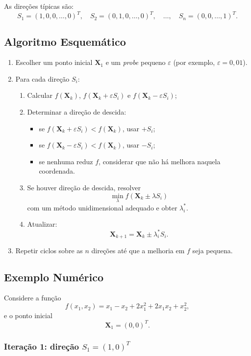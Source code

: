 \documentclass[9pt,a4paper]{extarticle}
\begin{document}
As direções típicas são:
\[
S_1 = (1, 0, 0, \dots, 0)^T,\quad
S_2 = (0, 1, 0, \dots, 0)^T,\quad
\dots,\quad
S_n = (0, 0, \dots, 1)^T.
\]

\subsection{Algoritmo Esquemático}

\begin{enumerate}
    \item Escolher um ponto inicial $\bm{X}_1$ e um \emph{probe} pequeno $\varepsilon$ (por exemplo, $\varepsilon = 0{,}01$).
    \item Para cada direção $S_i$:
    \begin{enumerate}[label=(\alph*)]
        \item Calcular $f(\bm{X}_k)$, $f(\bm{X}_k + \varepsilon S_i)$ e $f(\bm{X}_k - \varepsilon S_i)$;
        \item Determinar a direção de descida:
        \begin{itemize}
            \item se $f(\bm{X}_k + \varepsilon S_i) < f(\bm{X}_k)$, usar $+S_i$;
            \item se $f(\bm{X}_k - \varepsilon S_i) < f(\bm{X}_k)$, usar $-S_i$;
            \item se nenhuma reduz $f$, considerar que não há melhora naquela coordenada.
        \end{itemize}
        \item Se houver direção de descida, resolver
        \[
            \min_\lambda f(\bm{X}_k \pm \lambda S_i)
        \]
        com um método unidimensional adequado e obter $\lambda_i^\ast$.
        \item Atualizar:
        \[
            \bm{X}_{k+1} = \bm{X}_k \pm \lambda_i^\ast S_i.
        \]
    \end{enumerate}
    \item Repetir ciclos sobre as $n$ direções até que a melhoria em $f$ seja pequena.
\end{enumerate}

\subsection{Exemplo Numérico}

Considere a função
\[
    f(x_1,x_2) = x_1 - x_2 + 2x_1^2 + 2x_1x_2 + x_2^2,
\]
e o ponto inicial
\[
    \bm{X}_1 = (0,0)^T.
\]

\subsubsection*{Iteração 1: direção $S_1 = (1,0)^T$}
\end{document}
